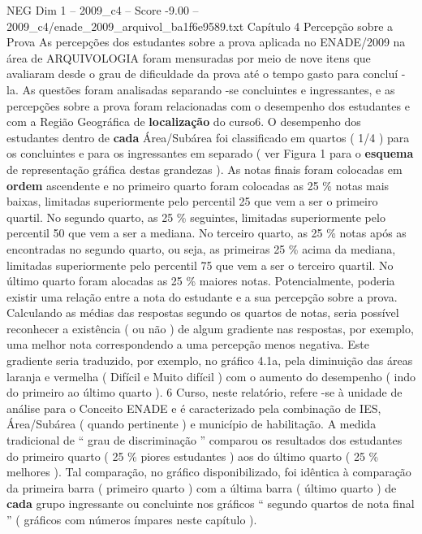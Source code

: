 \begin{textsample}{NEG Dim 1 – 2009\_c4 – Score -9.00 – 2009\_c4/enade\_2009\_arquivol\_ba1f6e9589.txt}  \label{ex:f1_neg_021}
Capítulo 4 Percepção sobre a Prova As percepções dos estudantes sobre a prova aplicada no ENADE/2009 na área de ARQUIVOLOGIA foram mensuradas por meio de nove itens que avaliaram desde o grau de dificuldade da prova até o tempo gasto para concluí -la.
As questões foram analisadas separando -se concluintes e ingressantes, e as percepções sobre a prova foram relacionadas com o desempenho dos estudantes e com a Região Geográfica de \textbf{localização} do curso6.
O desempenho dos estudantes dentro de \textbf{cada} Área/Subárea foi classificado em quartos ( 1/4 ) para os concluintes e para os ingressantes em separado ( ver Figura 1 para o \textbf{esquema} de representação gráfica destas grandezas ).
As notas finais foram colocadas em \textbf{ordem} ascendente e no primeiro quarto foram colocadas as 25 \% notas mais baixas, limitadas superiormente pelo percentil 25 que vem a ser o primeiro quartil.
No segundo quarto, as 25 \% seguintes, limitadas superiormente pelo percentil 50 que vem a ser a mediana.
No terceiro quarto, as 25 \% notas após as encontradas no segundo quarto, ou seja, as primeiras 25 \% acima da mediana, limitadas superiormente pelo percentil 75 que vem a ser o terceiro quartil.
No último quarto foram alocadas as 25 \% maiores notas.
Potencialmente, poderia existir uma relação entre a nota do estudante e a sua percepção sobre a prova.
Calculando as médias das respostas segundo os quartos de notas, seria possível reconhecer a existência ( ou não ) de algum gradiente nas respostas, por exemplo, uma melhor nota correspondendo a uma percepção menos negativa.
Este gradiente seria traduzido, por exemplo, no gráfico 4.1a, pela diminuição das áreas laranja e vermelha ( Difícil e Muito difícil ) com o aumento do desempenho ( indo do primeiro ao último quarto ). 6 Curso, neste relatório, refere -se à unidade de análise para o Conceito ENADE e é caracterizado pela combinação de IES, Área/Subárea ( quando pertinente ) e município de habilitação.
A medida tradicional de “ grau de discriminação ” comparou os resultados dos estudantes do primeiro quarto ( 25 \% piores estudantes ) aos do último quarto ( 25 \% melhores ).
Tal comparação, no gráfico disponibilizado, foi idêntica à comparação da primeira barra ( primeiro quarto ) com a última barra ( último quarto ) de \textbf{cada} grupo ingressante ou concluinte nos gráficos “ segundo quartos de nota final ” ( gráficos com números ímpares neste capítulo ).

\end{textsample}

